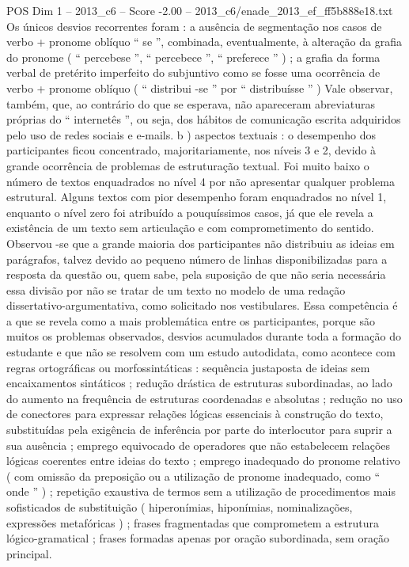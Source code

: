 \begin{textsample}{POS Dim 1 – 2013\_c6 – Score -2.00 – 2013\_c6/enade\_2013\_ef\_ff5b888e18.txt}
Os únicos desvios recorrentes foram : a ausência de segmentação nos casos de verbo + pronome oblíquo “ se ”, combinada, eventualmente, à alteração da grafia do pronome ( “ percebese ”, “ percebece ”, “ preferece ” ) ; a grafia da forma verbal de pretérito imperfeito do subjuntivo como se fosse uma ocorrência de verbo + pronome oblíquo ( “ distribui -se ” por “ distribuísse ” ) Vale observar, também, que, ao contrário do que se esperava, não apareceram abreviaturas próprias do “ internetês ”, ou seja, dos hábitos de comunicação escrita adquiridos pelo uso de redes sociais e e-mails. b ) aspectos textuais : o desempenho dos participantes ficou concentrado, majoritariamente, nos níveis 3 e 2, devido à grande ocorrência de problemas de estruturação textual.
Foi muito baixo o número de textos enquadrados no nível 4 por não apresentar qualquer problema estrutural.
Alguns textos com pior desempenho foram enquadrados no nível 1, enquanto o nível zero foi atribuído a pouquíssimos casos, já que ele revela a existência de um texto sem articulação e com comprometimento do sentido.
Observou -se que a grande maioria dos participantes não distribuiu as ideias em parágrafos, talvez devido ao pequeno número de linhas disponibilizadas para a resposta da questão ou, quem sabe, pela suposição de que não seria necessária essa divisão por não se tratar de um texto no modelo de uma redação dissertativo-argumentativa, como solicitado nos vestibulares.
Essa competência é a que se revela como a mais problemática entre os participantes, porque são muitos os problemas observados, desvios acumulados durante toda a formação do estudante e que não se resolvem com um estudo autodidata, como acontece com regras ortográficas ou morfossintáticas : sequência justaposta de ideias sem encaixamentos sintáticos ; redução drástica de estruturas subordinadas, ao lado do aumento na frequência de estruturas coordenadas e absolutas ; redução no uso de conectores para expressar relações lógicas essenciais à construção do texto, substituídas pela exigência de inferência por parte do interlocutor para suprir a sua ausência ; emprego equivocado de operadores que não estabelecem relações lógicas coerentes entre ideias do texto ; emprego inadequado do pronome relativo ( com omissão da preposição ou a utilização de pronome inadequado, como “ onde ” ) ; repetição exaustiva de termos sem a utilização de procedimentos mais sofisticados de substituição ( hiperonímias, hiponímias, nominalizações, expressões metafóricas ) ; frases fragmentadas que comprometem a estrutura lógico-gramatical ; frases formadas apenas por oração subordinada, sem oração principal.

\end{textsample}
